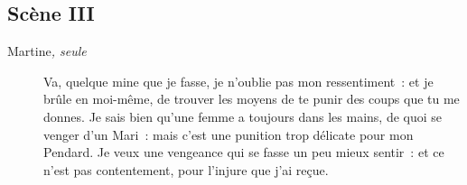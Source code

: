 \documentclass[french,twoside]{book} %
\begin{document}
\subsection[{Scène III}]{Scène III}
\label{I03}
 \begin{description} \item[Martine\textit{, seule}\par
] 

Va, quelque mine que je fasse, je n’oublie pas mon ressentiment : et je brûle en moi-même, de trouver les moyens de te punir des coups que tu me donnes. Je sais bien qu’une femme a toujours dans les mains, de quoi se venger d’un Mari : mais c’est une punition trop délicate pour mon Pendard. Je veux une vengeance qui se fasse un peu mieux sentir : et ce n’est pas contentement, pour l’injure que j’ai reçue.\end{description}
\end{document}
